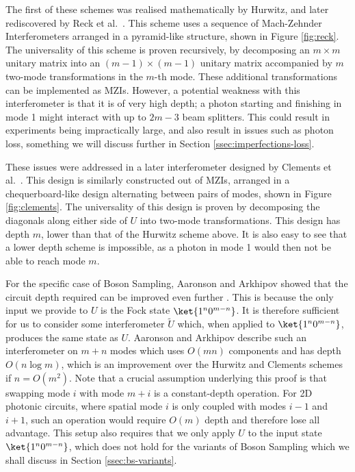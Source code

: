 The first of these schemes was realised mathematically by Hurwitz, and later rediscovered by Reck et al.~\cite{hurwitz1897, reck1994}. This scheme uses a sequence of Mach-Zehnder Interferometers arranged in a pyramid-like structure, shown in Figure \ref{fig:reck}. The universality of this scheme is proven recursively, by decomposing an $m\times m$ unitary matrix into an $(m-1)\times(m-1)$ unitary matrix accompanied by $m$ two-mode transformations in the $m$-th mode. These additional transformations can be implemented as MZIs. However, a potential weakness with this interferometer is that it is of very high depth; a photon starting and finishing in mode 1 might interact with up to $2m-3$ beam splitters. This could result in experiments being impractically large, and also result in issues such as photon loss, something we will discuss further in Section \ref{ssec:imperfections-loss}.

These issues were addressed in a later interferometer designed by Clements et al.~\cite{clements2016}. This design is similarly constructed out of MZIs, arranged in a chequerboard-like design alternating between pairs of modes, shown in Figure \ref{fig:clements}. The universality of this design is proven by decomposing the diagonals along either side of $U$ into two-mode transformations. This design has depth $m$, lower than that of the Hurwitz scheme above. It is also easy to see that a lower depth scheme is impossible, as a photon in mode 1 would then not be able to reach mode $m$.

For the specific case of Boson Sampling, Aaronson and Arkhipov showed that the circuit depth required can be improved even further \cite{aaronson2011, aaronson2010report}. This is because the only input we provide to $U$ is the Fock state $\ket{1^n0^{m-n}}$. It is therefore sufficient for us to consider some interferometer $\tilde{U}$ which, when applied to $\ket{1^n0^{m-n}}$, produces the same state as $U$. Aaronson and Arkhipov describe such an interferometer on $m+n$ modes which uses $O(mn)$ components and has depth $O(n\log m)$, which is an improvement over the Hurwitz and Clements schemes if $n=O(m^2)$. Note that a crucial assumption underlying this proof is that swapping mode $i$ with mode $m+i$ is a constant-depth operation. For 2D photonic circuits, where spatial mode $i$ is only coupled with modes $i-1$ and $i+1$, such an operation would require $O(m)$ depth and therefore lose all advantage. This setup also requires that we only apply $U$ to the input state $\ket{1^n0^{m-n}}$, which does not hold for the variants of Boson Sampling which we shall discuss in Section \ref{ssec:bs-variants}.

